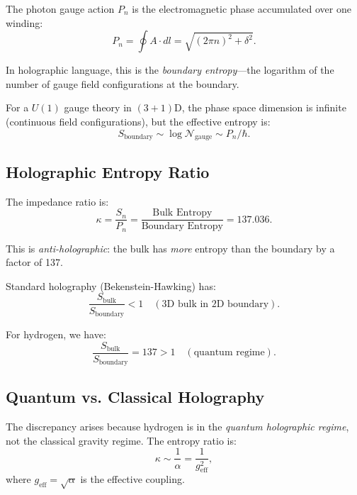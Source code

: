 \documentclass[aps,prd,twocolumn,superscriptaddress,floatfix]{revtex4-2}
\begin{document}
The photon gauge action $P_n$ is the electromagnetic phase accumulated over one winding:
\begin{equation}
P_n = \oint A \cdot dl = \sqrt{(2\pi n)^2 + \delta^2}.
\end{equation}

In holographic language, this is the \textit{boundary entropy}---the logarithm of the number of gauge field configurations at the boundary.

For a $U(1)$ gauge theory in $(3+1)$D, the phase space dimension is infinite (continuous field configurations), but the effective entropy is:
\begin{equation}
S_{\text{boundary}} \sim \log \mathcal{N}_{\text{gauge}} \sim P_n / \hbar.
\end{equation}

\subsection{Holographic Entropy Ratio}

The impedance ratio is:
\begin{equation}
\kappa = \frac{S_n}{P_n} = \frac{\text{Bulk Entropy}}{\text{Boundary Entropy}} = 137.036.
\end{equation}

This is \textit{anti-holographic}: the bulk has \textit{more} entropy than the boundary by a factor of 137.

Standard holography (Bekenstein-Hawking) has:
\begin{equation}
\frac{S_{\text{bulk}}}{S_{\text{boundary}}} < 1 \quad (\text{3D bulk in 2D boundary}).
\end{equation}

For hydrogen, we have:
\begin{equation}
\frac{S_{\text{bulk}}}{S_{\text{boundary}}} = 137 > 1 \quad (\text{quantum regime}).
\end{equation}

\subsection{Quantum vs. Classical Holography}

The discrepancy arises because hydrogen is in the \textit{quantum holographic regime}, not the classical gravity regime. The entropy ratio is:
\begin{equation}
\kappa \sim \frac{1}{\alpha} = \frac{1}{g_{\text{eff}}^2},
\end{equation}
where $g_{\text{eff}} = \sqrt{\alpha}$ is the effective coupling.
\end{document}
